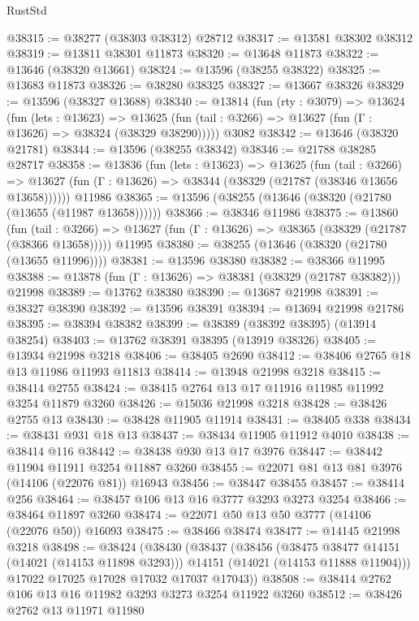 \begin{lexlean}{RustStd}
\begin{coremodule}
@38315 := @38277 (@38303 @38312) @28712
@38317 := @13581 @38302 @38312
@38319 := @13811 @38301 @11873
@38320 := @13648 @11873
@38322 := @13646 (@38320 @13661)
@38324 := @13596 (@38255 @38322)
@38325 := @13683 @11873
@38326 := @38280 @38325
@38327 := @13667 @38326
@38329 := @13596 (@38327 @13688)
@38340 := @13814
    (fun (rty : @3079) =>
    @13624
      (fun (lets : @13623) =>
      @13625 (fun (tail : @3266) => @13627 (fun (Γ : @13626) => @38324 (@38329 @38290)))))
    @3082
@38342 := @13646 (@38320 @21781)
@38344 := @13596 (@38255 @38342)
@38346 := @21788 @38285 @28717
@38358 := @13836
    (fun (lets : @13623) =>
    @13625
      (fun (tail : @3266) =>
      @13627 (fun (Γ : @13626) => @38344 (@38329 (@21787 (@38346 @13656 @13658))))))
    @11986
@38365 := @13596 (@38255 (@13646 (@38320 (@21780 (@13655 (@11987 @13658))))))
@38366 := @38346 @11986
@38375 := @13860
    (fun (tail : @3266) => @13627 (fun (Γ : @13626) => @38365 (@38329 (@21787 (@38366 @13658)))))
    @11995
@38380 := @38255 (@13646 (@38320 (@21780 (@13655 @11996))))
@38381 := @13596 @38380
@38382 := @38366 @11995
@38388 := @13878 (fun (Γ : @13626) => @38381 (@38329 (@21787 @38382))) @21998
@38389 := @13762 @38380
@38390 := @13687 @21998
@38391 := @38327 @38390
@38392 := @13596 @38391
@38394 := @13694 @21998 @21786
@38395 := @38394 @38382
@38399 := @38389 (@38392 @38395) (@13914 @38254)
@38403 := @13762 @38391 @38395 (@13919 @38326)
@38405 := @13934 @21998 @3218
@38406 := @38405 @2690
@38412 := @38406 @2765 @18 @13 @11986 @11993 @11813
@38414 := @13948 @21998 @3218
@38415 := @38414 @2755
@38424 := @38415 @2764 @13 @17 @11916 @11985 @11992 @3254 @11879 @3260
@38426 := @15036 @21998 @3218
@38428 := @38426 @2755 @13
@38430 := @38428 @11905 @11914
@38431 := @38405 @338
@38434 := @38431 @931 @18 @13
@38437 := @38434 @11905 @11912 @4010
@38438 := @38414 @116
@38442 := @38438 @930 @13 @17 @3976
@38447 := @38442 @11904 @11911 @3254 @11887 @3260
@38455 := @22071 @81 @13 @81 @3976 (@14106 (@22076 @81)) @16943
@38456 := @38447 @38455
@38457 := @38414 @256
@38464 := @38457 @106 @13 @16 @3777 @3293 @3273 @3254
@38466 := @38464 @11897 @3260
@38474 := @22071 @50 @13 @50 @3777 (@14106 (@22076 @50)) @16093
@38475 := @38466 @38474
@38477 := @14145 @21998 @3218
@38498 := @38424
    (@38430
      (@38437
        (@38456
          (@38475 @38477 @14151 (@14021 (@14153 @11898 @3293)))
          @14151
          (@14021 (@14153 @11888 @11904)))
        @17022
        @17025
        @17028
        @17032
        @17037
        @17043))
@38508 := @38414 @2762 @106 @13 @16 @11982 @3293 @3273 @3254 @11922 @3260
@38512 := @38426 @2762 @13 @11971 @11980

\end{coremodule}
\end{lexlean}
